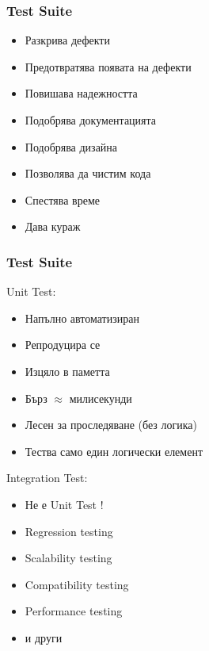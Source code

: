 \begin{frame}
  \frametitle{Test Suite}
  \pause
  \begin{itemize}
    \item Разкрива дефекти\pause
    \item Предотвратява появата на дефекти\pause
    \item Повишава надежността \pause
    \item Подобрява документацията\pause
    \item Подобрява дизайна\pause
    \item Позволява да чистим кода\pause
    \item Спестява време\pause
    \item Дава кураж
  \end{itemize}
\end{frame}

\begin{frame}
  \frametitle{Test Suite}
    \begin{minipage}[t]{0.48\linewidth}
        Unit Test:
        \begin{itemize}
          \item Напълно автоматизиран \pause
          \item Репродуцира се \pause
          \item Изцяло в паметта\pause
          \item Бърз $\approx$ милисекунди \pause
          \item Лесен за проследяване (без логика) \pause
          \item Тества само един логически елемент \pause
        \end{itemize}
    \end{minipage}\hfill
    \begin{minipage}[t]{0.48\linewidth}
        Integration Test:
        \begin{itemize}
          \item Не е Unit Test !\pause
          \item Regression testing\pause
          \item Scalability testing\pause
          \item Compatibility testing\pause
          \item Performance testing\pause
          \item и други
        \end{itemize}
    \end{minipage}
\end{frame}

